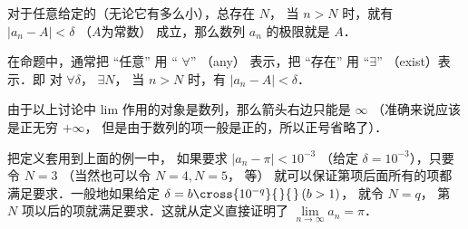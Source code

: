 对于任意给定的（无论它有多么小），总存在 $N$， 当 $n>N$ 时，就有 $\left| {{a_n} - A} \right| < \delta $ （$A$为常数） 成立，那么数列 $a_n$ 的极限就是 $A$． 

在命题中，通常把 “任意” 用 “ $\forall$” （any） 表示，把 “存在” 用 “$\exists $” （exist）表示．即
对 $\forall \delta$， $\exists N$， 当 $n>N$ 时，有 $\left| {{a_n} - A} \right| < \delta$． 

由于以上讨论中 lim 作用的对象是数列，那么箭头右边只能是 $\infty$ （准确来说应该是正无穷 $+\infty$， 但是由于数列的项一般是正的，所以正号省略了）．

把定义套用到上面的例一中， 如果要求 $\left| {{a_n} - \pi } \right| < {10^{ - 3}}$ （给定 $\delta  = {10^{ - 3}}$），只要令 $N=3$ （当然也可以令 $N=4, N=5$， 等） 就可以保证第项后面所有的项都满足要求．一般地如果给定 $\delta  = b \cross {10^{ - q}}{\kern 1pt} {\kern 1pt} \left( {b > 1} \right)$， 就令 $N = q$， 第 $N$ 项以后的项就满足要求．这就从定义直接证明了 $\mathop {\lim }\limits_{n \to \infty } {a_n} = \pi $． 


